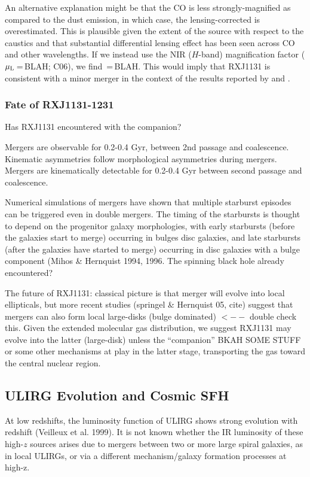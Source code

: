 \documentclass[]{emulateapj}
\begin{document}
An alternative explanation might be that the
CO is less strongly-magnified as compared to the dust emission,
in which case, the lensing-corrected \LFIR is overestimated.
This is plausible given the extent of the source with respect to the caustics
and that substantial differential lensing effect has been seen across CO and other
wavelengths. If we instead use the NIR ($H$-band) magnification factor ($\mu_{\rm L}$\,=\,BLAH; C06),
we find \LFIR\,=\,BLAH. This would imply that RXJ1131 is consistent with a minor
merger in the context of the results reported by \citet{Carpineti15a} and \citet{Larson16a}.

\subsubsection{Fate of RXJ1131-1231}
Has RXJ1131 encountered with the companion?

Mergers are observable for 0.2-0.4 Gyr,
between 2nd passage and coalescence.
Kinematic asymmetries follow morphological asymmetries during
mergers. Mergers are kinematically detectable for 0.2-0.4 Gyr
between second passage and coalescence.

Numerical simulations of mergers have shown that
multiple starburst episodes can be triggered even in double mergers.
The timing of the starbursts is thought to depend on the progenitor galaxy
morphologies, with early starbursts (before the galaxies start to merge)
occurring in bulges disc galaxies, and late starbursts (after the galaxies
have started to merge) occurring in disc galaxies with a bulge component (Mihos \& Hernquist 1994, 1996.
The spinning black hole already encountered?

The future of RXJ1131:
classical picture is that merger will evolve into local ellipticals, but more
recent studies (springel \& Hernquist 05, cite) suggest that mergers can also
form local large-disks (bulge dominated) $<--$ double check this. Given the
extended molecular gas distribution, we suggest RXJ1131 may evolve into the
latter (large-disk) unless the ``companion'' BKAH SOME STUFF or some other
mechanisms at play in the latter stage, transporting the gas
toward the central nuclear region.

\subsection{ULIRG Evolution and Cosmic SFH}
At low redshifts, the luminosity function of ULIRG shows strong evolution with
redshift (Veilleux et al. 1999). It is not known whether the IR luminosity of
these high-$z$ sources arises due to mergers between two or more large spiral
galaxies, as in local ULIRGs, or via a different mechanism/galaxy formation
processes at high-z.
\end{document}
